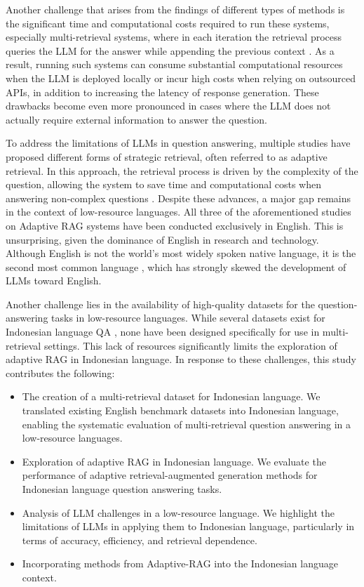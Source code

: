 \documentclass[times]{iapress}
\begin{document}
Another challenge that arises from the findings of different types of methods is the significant time and computational costs required to run these systems, especially multi-retrieval systems, where in each iteration the retrieval process queries the LLM for the answer while appending the previous context \cite{ircot}. As a result, running such systems can consume substantial computational resources when the LLM is deployed locally or incur high costs when relying on outsourced APIs, in addition to increasing the latency of response generation. These drawbacks become even more pronounced in cases where the LLM does not actually require external information to answer the question. 

To address the limitations of LLMs in question answering, multiple studies have proposed different forms of strategic retrieval, often referred to as adaptive retrieval. In this approach, the retrieval process is driven by the complexity of the question, allowing the system to save time and computational costs when answering non-complex questions \cite{trust_llm} \cite{adaptive_rag} \cite{vary_reasoning}. Despite these advances, a major gap remains in the context of low-resource languages. All three of the aforementioned studies on Adaptive RAG systems have been conducted exclusively in English. This is unsurprising, given the dominance of English in research and technology. Although English is not the world's most widely spoken native language, it is the second most common language \cite{english_dominance}, which has strongly skewed the development of LLMs toward English.

Another challenge lies in the availability of high-quality datasets for the question-answering tasks in low-resource languages. While several datasets exist for Indonesian language QA \cite{indoqa} \cite{qasina}, none have been designed specifically for use in multi-retrieval settings. This lack of resources significantly limits the exploration of adaptive RAG in Indonesian language. In response to these challenges, this study contributes the following:  
\begin{itemize}
    \item The creation of a multi-retrieval dataset for Indonesian language. We translated existing English benchmark datasets into Indonesian language, enabling the systematic evaluation of multi-retrieval question answering in a low-resource languages.
    \item Exploration of adaptive RAG in Indonesian language. We evaluate the performance of adaptive retrieval-augmented generation methods for Indonesian language question answering tasks.
    \item Analysis of LLM challenges in a low-resource language. We highlight the limitations of LLMs in applying them to Indonesian language, particularly in terms of accuracy, efficiency, and retrieval dependence.
    \item Incorporating methods from Adaptive-RAG \cite{adaptive_rag} into the Indonesian language context.
\end{itemize}
\end{document}

